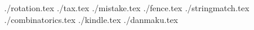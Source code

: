 \documentclass[11pt,letterpaper,oneside]{article}
\newcommand{\importproblem}[2]{{./#2.tex}}
\begin{document}
\raggedbottom

\importproblem{a}{rotation}
\importproblem{b}{tax}
\importproblem{c}{mistake}
\importproblem{e}{fence}
\importproblem{g}{stringmatch}
\importproblem{h}{combinatorics}
\importproblem{k}{kindle}
\importproblem{l}{danmaku}
\end{document}
